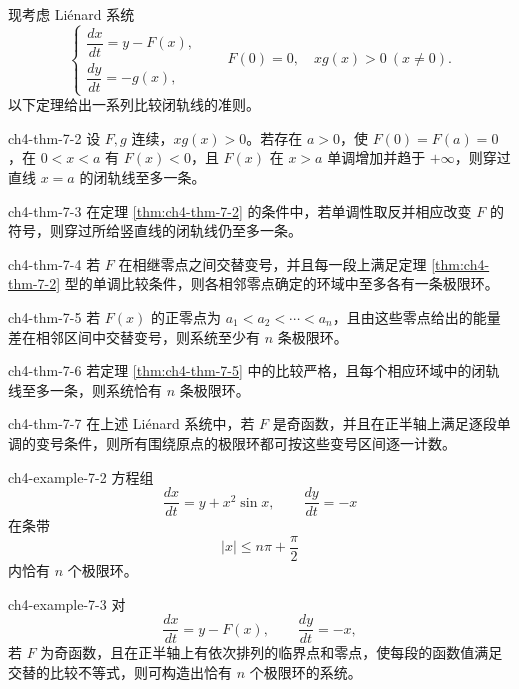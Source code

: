 现考虑 Liénard 系统
\[
\begin{cases}
\dfrac{dx}{dt}=y-F(x),\\
\dfrac{dy}{dt}=-g(x),
\end{cases}\qquad F(0)=0,\quad xg(x)>0\ (x\ne0).
\]
以下定理给出一系列比较闭轨线的准则。

\begin{theorem}{}{ch4-thm-7-2}
设 $F,g$ 连续，$xg(x)>0$。若存在 $a>0$，使 $F(0)=F(a)=0$，在 $0<x<a$ 有 $F(x)<0$，且 $F(x)$ 在 $x>a$ 单调增加并趋于 $+\infty$，则穿过直线 $x=a$ 的闭轨线至多一条。
\end{theorem}

\begin{theorem}{}{ch4-thm-7-3}
在定理 \ref{thm:ch4-thm-7-2} 的条件中，若单调性取反并相应改变 $F$ 的符号，则穿过所给竖直线的闭轨线仍至多一条。
\end{theorem}

\begin{theorem}{}{ch4-thm-7-4}
若 $F$ 在相继零点之间交替变号，并且每一段上满足定理 \ref{thm:ch4-thm-7-2} 型的单调比较条件，则各相邻零点确定的环域中至多各有一条极限环。
\end{theorem}

\begin{theorem}{}{ch4-thm-7-5}
若 $F(x)$ 的正零点为 $a_1<a_2<\cdots<a_n$，且由这些零点给出的能量差在相邻区间中交替变号，则系统至少有 $n$ 条极限环。
\end{theorem}

\begin{theorem}{}{ch4-thm-7-6}
若定理 \ref{thm:ch4-thm-7-5} 中的比较严格，且每个相应环域中的闭轨线至多一条，则系统恰有 $n$ 条极限环。
\end{theorem}

\begin{theorem}{}{ch4-thm-7-7}
在上述 Liénard 系统中，若 $F$ 是奇函数，并且在正半轴上满足逐段单调的变号条件，则所有围绕原点的极限环都可按这些变号区间逐一计数。
\end{theorem}

\begin{example}{ }{ch4-example-7-2}
方程组
\[
\dfrac{dx}{dt}=y+x^2\sin x,\qquad \dfrac{dy}{dt}=-x
\]
在条带
\[
|x|\leqslant n\pi+\dfrac\pi2
\]
内恰有 $n$ 个极限环。
\end{example}

\begin{example}{ }{ch4-example-7-3}
对
\[
\dfrac{dx}{dt}=y-F(x),\qquad \dfrac{dy}{dt}=-x,
\]
若 $F$ 为奇函数，且在正半轴上有依次排列的临界点和零点，使每段的函数值满足交替的比较不等式，则可构造出恰有 $n$ 个极限环的系统。
\end{example}

